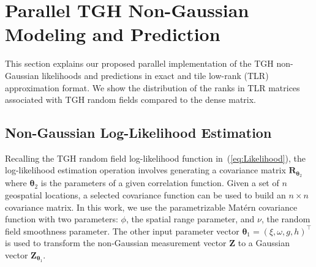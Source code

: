 \documentclass[conference]{IEEEtran}
\begin{document}

\section{Parallel TGH Non-Gaussian Modeling and Prediction}

This section explains our proposed parallel
implementation of the TGH non-Gaussian likelihoods
and predictions in exact and tile low-rank (TLR) approximation
format. We show the
distribution of the ranks in TLR matrices
associated with TGH random fields compared to the dense matrix.



\subsection{Non-Gaussian Log-Likelihood Estimation}
Recalling the TGH random field log-likelihood function
in~(\ref{eq:Likelihood}), the log-likelihood estimation
operation involves generating a covariance 
matrix $\bm{R}_{\bm{\theta}_2}$ where $\bm{\theta}_2$ is the parameters of 
a given correlation function. Given a set of $n$ geospatial
locations, a selected covariance function can be used to
build an $n \times n$ covariance matrix. In this work, we
use the parametrizable Mat\'ern covariance function with
two parameters: $\phi$, the spatial range parameter, 
and $\nu$, the random field smoothness parameter.  
The other input parameter vector $\bm{\theta}_1= (\xi, \omega, g, h)^\top$ 
is used to transform the non-Gaussian measurement 
vector $\bm{Z}$  to a Gaussian vector $\bm{Z}_{\bm{\theta}_1}$. 
\end{document}
